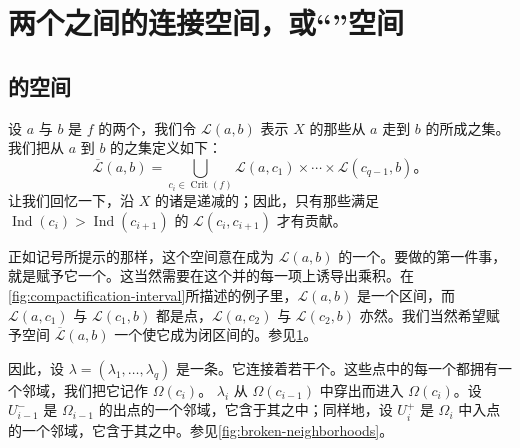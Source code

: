
\section{两个\trCriticalPoint{}之间的连接空间，或“\trBrokenTrajectory”空间}
\label{sec:space-of-connections}

\subsection{\trBrokenTrajectory{}的空间}
\label{subsec:space-broken-trajectories}

设 $a$ 与 $b$ 是 $f$ 的两个\trCriticalPoint，我们令 $\mathcal{L}(a,b)$ 表示\trVectorField{} $X$ 的那些从 $a$ 走到 $b$ 的\trTrajectory{}所成之集。我们把从 $a$ 到 $b$ 的\trBrokenTrajectory{}之集定义如下：
\[
\overline{\mathcal{L}}(a,b)=\bigcup_{c_i\in\operatorname{Crit}(f)}
  \mathcal{L}(a,c_1)\times\cdots\times\mathcal{L}(c_{q-1},b)\text{。}
\]
让我们回忆一下，\trIndex{}沿 $X$ 的诸\trTrajectory{}是递减的；因此，只有那些满足 $\operatorname{Ind}(c_i)>\operatorname{Ind}(c_{i+1})$ 的 $\mathcal{L}(c_i,c_{i+1})$ 才有贡献。

正如记号所提示的那样，这个空间意在成为 $\mathcal{L}(a,b)$ 的一个\trCompactification。要做的第一件事，就是赋予它一个\trTopology。这当然需要在这个并的每一项上诱导出乘积\trTopology。在\cref{fig:compactification-interval}所描述的例子里，$\mathcal{L}(a,b)$ 是一个\trOpen{}区间，而 $\mathcal{L}(a,c_1)$ 与 $\mathcal{L}(c_1,b)$ 都是点，$\mathcal{L}(a,c_2)$ 与 $\mathcal{L}(c_2,b)$ 亦然。我们当然希望赋予空间 $\overline{\mathcal{L}}(a,b)$ 一个使它成为闭区间的\trTopology。参见\cref{fig:union-intervals}。

\begin{figure}[htbp]
\centering
{}
\caption{}
\label{fig:union-intervals}
\end{figure}

因此，设 $\lambda=(\lambda_1,\dotsc,\lambda_q)$ 是一条\trBrokenTrajectory。它连接着若干个\trCriticalPoint。这些点中的每一个都拥有一个\trMorse{}邻域，我们把它记作 $\Omega(c_i)$。\trTrajectory{} $\lambda_i$ 从 $\Omega(c_{i-1})$ 中穿出而进入 $\Omega(c_i)$。设 $U_{i-1}^-$ 是 $\Omega_{i-1}$ 的出点的一个邻域，它含于其\trLevelSet{}之中；同样地，设 $U_i^+$ 是 $\Omega_i$ 中入点的一个邻域，它含于其\trLevelSet{}之中。参见\cref{fig:broken-neighborhoods}。

